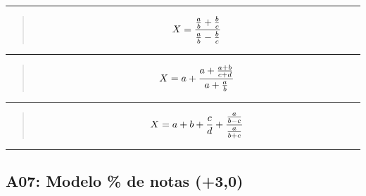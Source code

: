 \documentclass[letterpaper,10pt,spanish]{sphinxmanual}
\begin{document}
\begin{enumerate}
\bigskip\hrule\bigskip


\sphinxAtStartPar
{}
\begin{quote}
\begin{equation*}
\begin{split} X = { { a \over b } + { b \over c } \over { a \over b } - { b \over c } } \end{split}
\end{equation*}\end{quote}


\bigskip\hrule\bigskip


\sphinxAtStartPar
{}
\begin{quote}
\begin{equation*}
\begin{split} X = a + { a + { a + b \over c + d } \over a + { a \over b }  } \end{split}
\end{equation*}\end{quote}


\bigskip\hrule\bigskip


\sphinxAtStartPar
{}
\begin{quote}
\begin{equation*}
\begin{split} X = a + b + { c \over d } + { { a \over b - c } \over { a \over b + c } } \end{split}
\end{equation*}\end{quote}

\end{enumerate}


\bigskip\hrule\bigskip



\subsection{A07: Modelo \% de notas (+3,0)}
\label{\detokenize{1_guias/10programacion/G1025:a07-modelo-de-notas-3-0}}
\sphinxAtStartPar
{}
\end{document}
